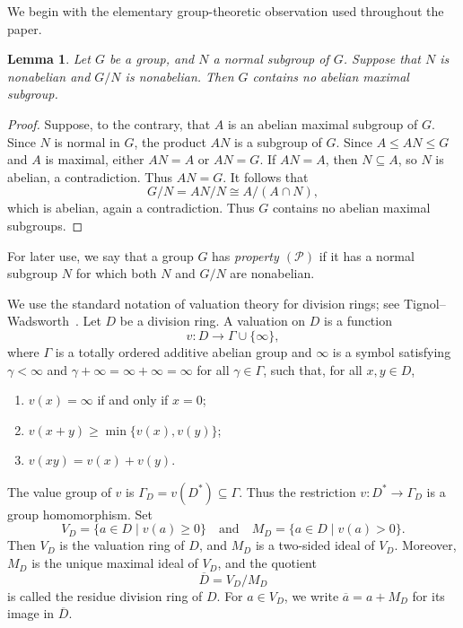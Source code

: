 \documentclass[11pt]{amsart}
\newtheorem{lemma}[theorem]{Lemma}
\theoremstyle{definition}
\begin{document}
We begin with the elementary group-theoretic observation used throughout the
paper.

\begin{lemma}\label{lem:normal-obstruction}
Let $G$ be a group, and $N$ a normal subgroup of $G$. Suppose that $N$ is nonabelian and $G/N$ is nonabelian. Then $G$ contains no abelian maximal subgroup.
\end{lemma}
\begin{proof}
Suppose, to the contrary, that $A$ is an abelian maximal subgroup of $G$. Since $N$ is normal in $G$, the product $AN$ is a subgroup of $G$. Since $A\leq AN\leq G$ and $A$ is maximal, either $AN=A$ or $AN=G$. If $AN=A$, then $N\subseteq A$, so $N$ is abelian, a contradiction. Thus $AN=G$. It follows that 
$$
G/N=AN/N\cong A/(A\cap N),
$$
which is abelian, again a contradiction. Thus $G$ contains no abelian maximal subgroups.
\end{proof}
For later use, we say that a group $G$ has \textit{property $(\mathcal P)$} if it has a normal subgroup $N$ for which both $N$ and $G/N$ are nonabelian.

We use the standard notation of valuation theory for division rings; see Tignol--Wadsworth~\cite[§1.1.1]{TW}. Let $D$ be a division ring. A valuation on $D$ is a function
$$
        v:D\longrightarrow \Gamma\cup\{\infty\},
$$
where $\Gamma$ is a totally ordered additive abelian group and $\infty$ is a symbol satisfying $\gamma<\infty$ and $\gamma+\infty=\infty+\infty=\infty$ for all $\gamma\in\Gamma$, such that, for all $x,y\in D$,
\begin{enumerate}
        \item $v(x)=\infty$ if and only if $x=0$;
        \item $v(x+y)\geq \min\{v(x),v(y)\}$;
        \item $v(xy)=v(x)+v(y)$.
\end{enumerate}
The value group of $v$ is $\Gamma_D=v(D^*)\subseteq\Gamma$. Thus the restriction $v:D^*\to \Gamma_D$ is a group homomorphism.
Set
$$
        V_D=\{a\in D\mid v(a)\geq 0\}
        \quad
        \text{and}
        \quad
        M_D=\{a\in D\mid v(a)>0\}.
$$
Then $V_D$ is the valuation ring of $D$, and $M_D$ is a two-sided ideal of $V_D$.  Moreover, $M_D$ is the unique maximal ideal of $V_D$, and the quotient
$$
        \overline D=V_D/M_D
$$
is called the residue division ring of $D$.  For $a\in V_D$, we write $\overline a=a+M_D$ for its image in $\overline D$.
\end{document}
